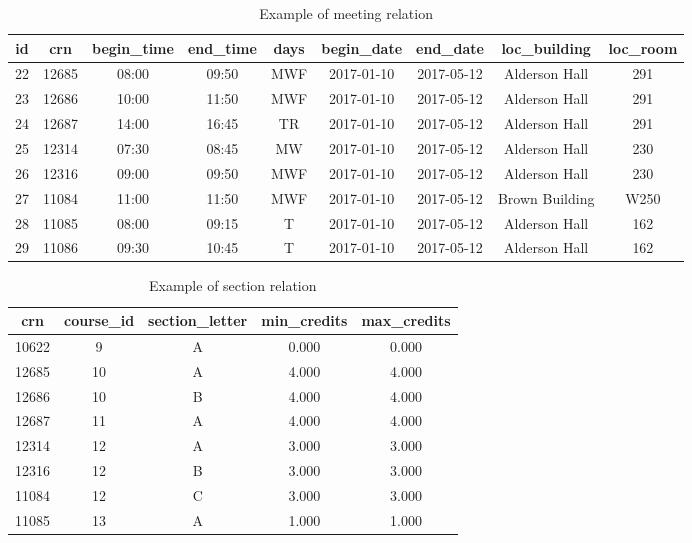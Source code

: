 \documentclass[12pt,letterpaper,titlepage]{article}
\begin{document}
\begin{table}[H]
\footnotesize
\centering
\begin{tabular}{|c|c|c|c|c|c|c|c|c|}
\hline
id & crn & begin\_time & end\_time & days & begin\_date & end\_date & loc\_building & loc\_room \\ \hline
22 & 12685 & 08:00 & 09:50 & MWF & 2017-01-10 & 2017-05-12 & Alderson Hall & 291 \\ \hline
23 & 12686 & 10:00 & 11:50 & MWF & 2017-01-10 & 2017-05-12 & Alderson Hall & 291 \\ \hline
24 & 12687 & 14:00 & 16:45 & TR & 2017-01-10 & 2017-05-12 & Alderson Hall & 291 \\ \hline
25 & 12314 & 07:30 & 08:45 & MW & 2017-01-10 & 2017-05-12 & Alderson Hall & 230 \\ \hline
26 & 12316 & 09:00 & 09:50 & MWF & 2017-01-10 & 2017-05-12 & Alderson Hall & 230 \\ \hline
27 & 11084 & 11:00 & 11:50 & MWF & 2017-01-10 & 2017-05-12 & Brown Building & W250 \\ \hline
28 & 11085 & 08:00 & 09:15 & T & 2017-01-10 & 2017-05-12 & Alderson Hall & 162 \\ \hline
29 & 11086 & 09:30 & 10:45 & T & 2017-01-10 & 2017-05-12 & Alderson Hall & 162 \\ \hline
\end{tabular}
\caption{\label{tbl:meeting} Example of meeting relation}
\end{table}

\begin{table}[H]
\centering
\begin{tabular}{|c|c|c|c|c|}
\hline
crn & course\_id & section\_letter & min\_credits & max\_credits \\ \hline
10622 & 9 & A & 0.000 & 0.000 \\ \hline
12685 & 10 & A & 4.000 & 4.000 \\ \hline
12686 & 10 & B & 4.000 & 4.000 \\ \hline
12687 & 11 & A & 4.000 & 4.000 \\ \hline
12314 & 12 & A & 3.000 & 3.000 \\ \hline
12316 & 12 & B & 3.000 & 3.000 \\ \hline
11084 & 12 & C & 3.000 & 3.000 \\ \hline
11085 & 13 & A & 1.000 & 1.000 \\ \hline
\end{tabular}
\caption{\label{tbl:section} Example of section relation}
\end{table}
\end{document}
